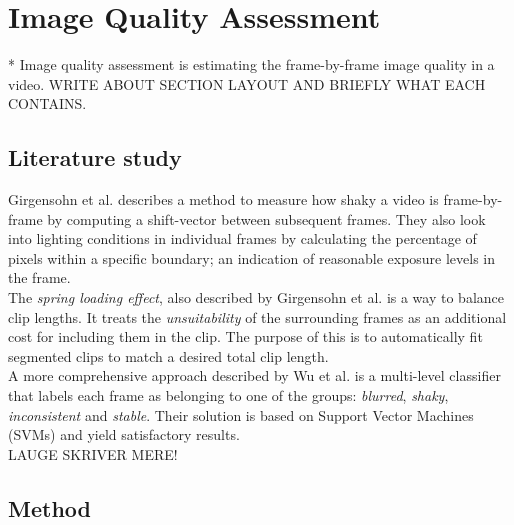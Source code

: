 %
\chapter{Image Quality Assessment}*
%
Image quality assessment is estimating the frame-by-frame image quality in a video. WRITE ABOUT SECTION LAYOUT AND BRIEFLY WHAT EACH CONTAINS.%
%
\section{Literature study}
Girgensohn et al.\cite{Girgensohn:2000:SAH:354401.354415} describes a method to measure how shaky a video is frame-by-frame by computing a shift-vector between subsequent frames. They also look into lighting conditions in individual frames by calculating the percentage of pixels within a specific boundary; an indication of reasonable exposure levels in the frame.\\
The \textit{spring loading effect}\cite{Girgensohn:2000:SAH:354401.354415}, also described by Girgensohn et al. is a way to balance clip lengths. It treats the \textit{unsuitability} of the surrounding frames as an additional cost for including them in the clip. The purpose of this is to automatically fit segmented clips to match a desired total clip length.\\
%
A more comprehensive approach described by Wu et al.\cite{10.1109/ICME.2005.1521399} is a multi-level classifier that labels each frame as belonging to one of the groups: \textit{blurred}, \textit{shaky}, \textit{inconsistent} and \textit{stable}. Their solution is based on Support Vector Machines (SVMs) and yield satisfactory results.\\ %
LAUGE SKRIVER MERE!
%
\section{Method}
%
%
